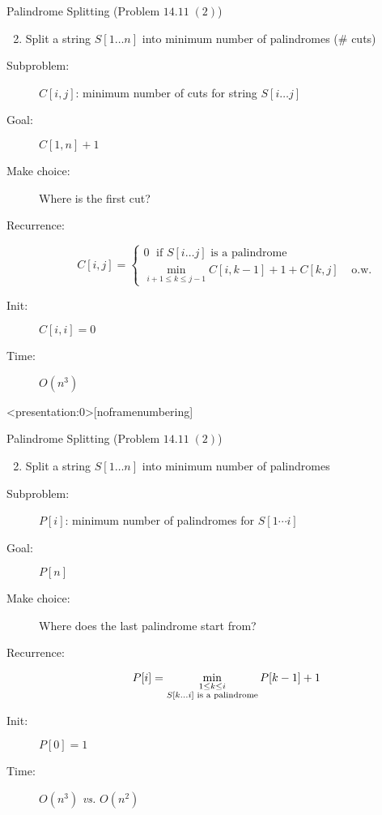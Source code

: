 \begin{frame}{}
  \begin{exampleblock}{Palindrome Splitting (Problem $14.11\; (2)$)}
    \begin{enumerate}[(1)]
      \setcounter{enumi}{1}
      \item Split a string $S[1 \dots n]$ into minimum number of palindromes (\# cuts)
    \end{enumerate}
  \end{exampleblock}

  \begin{description}
	\item[Subproblem:] $C[i,j]$: minimum number of cuts for string $S[i \dots j]$
	\item[Goal:] $C[1,n] + 1$
	  \pause
	\item[Make choice:] Where is the first cut?
	\item[Recurrence:] 
	  \[
		C[i,j] = \left\{ \begin{array}{ll}
		  0	\; \text{ if } S[i \dots j] \text{ is a palindrome} & \\
		  \min\limits_{i+1 \le k \le j-1} C[i,k-1] + 1 + C[k,j] & \text{ o.w.}
		\end{array} \right.
	  \]
	  \pause
	\item[Init:] $C[i,i] = 0$
	\item[Time:] $O(n^3)$
  \end{description}
\end{frame}
\begin{frame}<presentation:0>[noframenumbering] %
  \begin{exampleblock}{Palindrome Splitting (Problem $14.11\; (2)$)}
    \begin{enumerate}[(1)]
      \setcounter{enumi}{1}
      \item Split a string $S[1 \dots n]$ into minimum number of palindromes
    \end{enumerate}
  \end{exampleblock}

  \begin{description}
	\item[Subproblem:] $P[i]$: minimum number of palindromes for $S[1 \cdots i]$
	\item[Goal:] $P[n]$
	  \pause
	\item[Make choice:] Where does the last palindrome start from?
	\item[Recurrence:] 
	  \[
		P[i] = \min_{\begin{subarray}{c}
			1 \le k \le i \\
			S[k \dots i] \text{ is a palindrome}
		  \end{subarray}} P[k-1] + 1
	  \]
	  \pause
	\item[Init:] $P[0] = 1$
	\item[Time:] $O(n^3)$ \emph{vs.} $O(n^2)$
  \end{description}
\end{frame}
